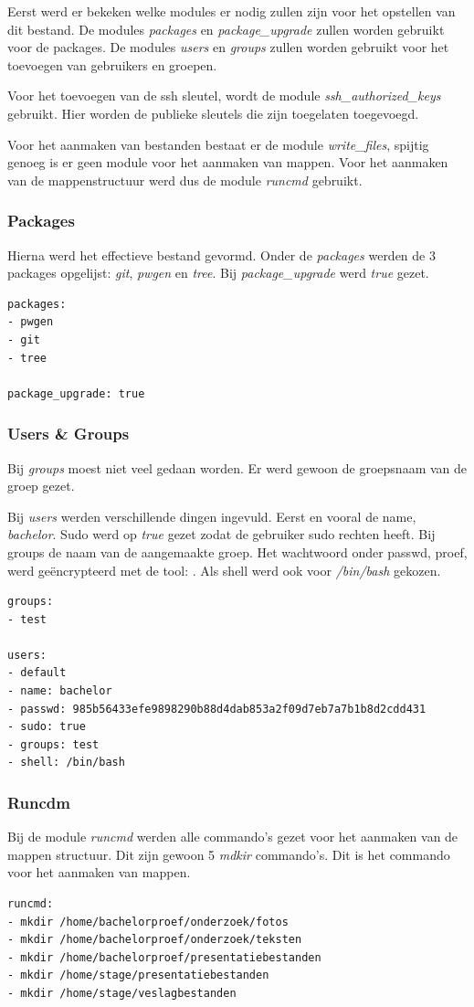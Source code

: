 Eerst werd er bekeken welke modules er nodig zullen zijn voor het opstellen van dit bestand. De modules \textit{packages} en \textit{package\_upgrade} zullen worden gebruikt voor de packages. De modules \textit{users} en \textit{groups} zullen worden gebruikt voor het toevoegen van gebruikers en groepen. 

Voor het toevoegen van de ssh sleutel, wordt de module \textit{ssh\_authorized\_keys} gebruikt. Hier worden de publieke sleutels die zijn toegelaten toegevoegd.

Voor het aanmaken van bestanden bestaat er de module \textit{write\_files}, spijtig genoeg is er geen module voor het aanmaken van mappen. Voor het aanmaken van de mappenstructuur werd dus de module \textit{runcmd} gebruikt.

\subsubsection{Packages}
Hierna werd het effectieve bestand gevormd. Onder de \textit{packages} werden de 3 packages opgelijst: \textit{git}, \textit{pwgen} en \textit{tree}. Bij \textit{package\_upgrade} werd \textit{true} gezet. 
\begin{lstlisting}
packages:
- pwgen
- git
- tree

package_upgrade: true
\end{lstlisting}

\subsubsection{Users \& Groups}
Bij \textit{groups} moest niet veel gedaan worden. Er werd gewoon de groepsnaam van de groep gezet.

Bij \textit{users} werden verschillende dingen ingevuld. Eerst en vooral de name, \textit{bachelor}. Sudo werd op \textit{true} gezet zodat de gebruiker sudo rechten heeft. Bij groups de naam van de aangemaakte groep. Het wachtwoord onder passwd, proef, werd geëncrypteerd met de tool: \autocite{toolmkpass}. Als shell werd ook voor \textit{/bin/bash} gekozen.
\begin{lstlisting}
groups:
- test

users:
- default
- name: bachelor
- passwd: 985b56433efe9898290b88d4dab853a2f09d7eb7a7b1b8d2cdd431
- sudo: true
- groups: test
- shell: /bin/bash
\end{lstlisting}


\subsubsection{Runcdm}
Bij de module \textit{runcmd} werden alle commando's gezet voor het aanmaken van de mappen structuur. Dit zijn gewoon 5 \textit{mdkir} commando's. Dit is het commando voor het aanmaken van mappen.
\begin{lstlisting}
runcmd:
- mkdir /home/bachelorproef/onderzoek/fotos
- mkdir /home/bachelorproef/onderzoek/teksten
- mkdir /home/bachelorproef/presentatiebestanden
- mkdir /home/stage/presentatiebestanden
- mkdir /home/stage/veslagbestanden
\end{lstlisting}

